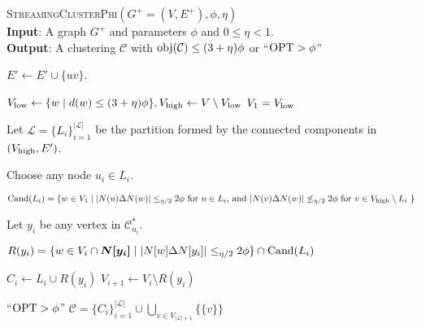 \begin{algorithm}[t]
\caption{{\textsc{StreamingClusterPhi}}$(G^+=(V, E^+), \phi, \eta)$\label{alg:streaming}\\
\textbf{Input}: A graph $G^{+}$ and parameters $\phi$ and $0 \leq \eta < 1$. \\
\textbf{Output}: A clustering $\mathcal{C}$ with $\mathrm{obj}(\mathcal{C})\leq (3+\eta)\phi$ or ``$\mathrm{OPT} > \phi$''}
\label{alg:streamingcp}
\begin{algorithmic}[1]

     
            \State $E' \leftarrow E' \cup \{uv\}$.
        \EndIf
    \EndFor

    \State $V_{\operatorname{low}} \leftarrow \{w \mid \mbox{$d(w) \leq (3+\eta) \phi$} \}, V_{\operatorname{high}} \leftarrow V \setminus V_{\operatorname{low}}$
    \State $V_1 = V_{\operatorname{low}}$

    \State Let $\mathcal{L} = \{L_i\}_{i=1}^{|\mathcal{L}|}$ be the partition formed by the connected components in $(V_{\operatorname{high}} ,E')$. 
        
    
      \label{ln:streamingupper}
    \State Choose any node $u_i \in L_i$.
    {
    \begin{tcolorbox}
    \State \label{ln:streamingstart} $\mathrm{Cand}(L_i) = \{ w \in V_1 \mid |N(u) \Delta N(w) | \leq_{\eta/2} 2\phi \text{ for $u \in L_i$, and } |N(v) \Delta N(w) | \not\leq_{\eta/2} 2\phi \text{ for $v \in V_{\operatorname{high}} \setminus L_i$ }\}$

    \State Let $y_i$ be any vertex in $\mathcal{C}^{*}_{u_i}$.

    \State \label{ln:streamingend} $R(y_i) = \{ w \in V_i \cap \bm{N[y_i]} \mid |N[w] \Delta N[y_i]|  \leq_{\eta/2} 2\phi  \} \cap \mathrm{Cand}(L_i)$
    \end{tcolorbox}
    }

 
    \State  \label{ln:streamingC} $C_i \leftarrow L_i \cup R(y_i)$                                       
    \State $V_{i + 1} \leftarrow V_i \setminus R(y_i)$ 

    \EndFor   \label{ln:streaminglower}
    \State \Return ``$\mathrm{OPT} > \phi$'' 
    \Else
    \State \Return $\mathcal{C} = \{C_i\}_{i=1}^{|\mathcal{L}|} \cup \bigcup_{v \in V_{|\mathcal{L}|+1}}\{ \{v\} \}$
    \EndIf

\EndFunction
\end{algorithmic}
\end{algorithm}

